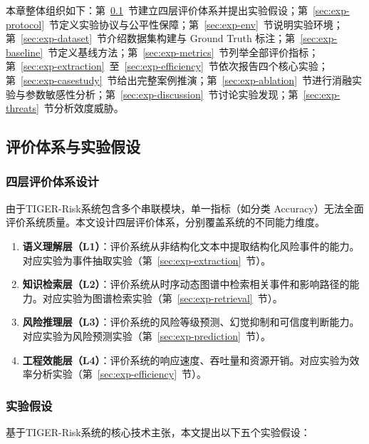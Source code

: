 \documentclass[12pt,a4paper]{article}
\newcommand{\projectshort}{TIGER-Risk}
\newcommand{\term}[1]{\textbf{#1}}
\begin{document}
本章整体组织如下：第~\ref{sec:exp-framework}~节建立四层评价体系并提出实验假设；第~\ref{sec:exp-protocol}~节定义实验协议与公平性保障；第~\ref{sec:exp-env}~节说明实验环境；第~\ref{sec:exp-dataset}~节介绍数据集构建与 Ground Truth 标注；第~\ref{sec:exp-baseline}~节定义基线方法；第~\ref{sec:exp-metrics}~节列举全部评价指标；第~\ref{sec:exp-extraction}~至~\ref{sec:exp-efficiency}~节依次报告四个核心实验；第~\ref{sec:exp-casestudy}~节给出完整案例推演；第~\ref{sec:exp-ablation}~节进行消融实验与参数敏感性分析；第~\ref{sec:exp-discussion}~节讨论实验发现；第~\ref{sec:exp-threats}~节分析效度威胁。

\subsection{评价体系与实验假设}
\label{sec:exp-framework}

\subsubsection{四层评价体系设计}

由于\projectshort 系统包含多个串联模块，单一指标（如分类 Accuracy）无法全面评价系统质量。本文设计四层评价体系，分别覆盖系统的不同能力维度。

\begin{enumerate}
    \item \term{语义理解层（L1）}：评价系统从非结构化文本中提取结构化风险事件的能力。对应实验为事件抽取实验（第~\ref{sec:exp-extraction}~节）。
    \item \term{知识检索层（L2）}：评价系统从时序动态图谱中检索相关事件和影响路径的能力。对应实验为图谱检索实验（第~\ref{sec:exp-retrieval}~节）。
    \item \term{风险推理层（L3）}：评价系统的风险等级预测、幻觉抑制和可信度判断能力。对应实验为风险预测实验（第~\ref{sec:exp-prediction}~节）。
    \item \term{工程效能层（L4）}：评价系统的响应速度、吞吐量和资源开销。对应实验为效率分析实验（第~\ref{sec:exp-efficiency}~节）。
\end{enumerate}

\subsubsection{实验假设}

基于\projectshort 系统的核心技术主张，本文提出以下五个实验假设：
\end{document}
